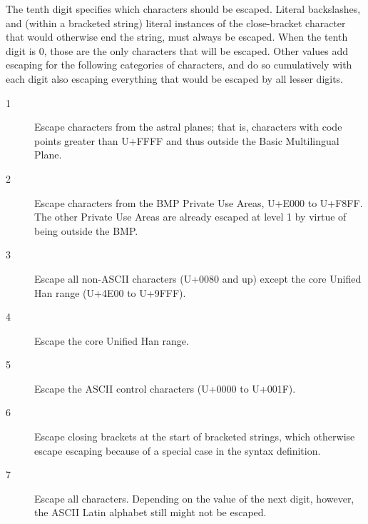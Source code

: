 \documentclass[twocolumn]{report}
\begin{document}
The tenth digit specifies which characters should be escaped.  Literal
backslashes, and (within a bracketed string) literal instances of the
close-bracket character that would otherwise end the string, must
always be escaped. 
When the tenth digit is 0, those are the only characters that will be escaped. 
Other values add escaping for the following categories of characters, and do
so cumulatively with each digit also escaping everything that would be
escaped by all lesser digits.
\begin{description}
  \item[1] Escape characters from the astral planes; that is,
    characters with code points greater than U+FFFF and thus outside the
    Basic Multilingual Plane.
  \item[2] Escape characters from the BMP Private Use Areas, U+E000 to
    U+F8FF.  The other Private Use Areas are already escaped at level 1
    by virtue of being outside the BMP.
  \item[3] Escape all non-ASCII characters (U+0080 and up) except the core
    Unified Han range (U+4E00 to U+9FFF).
  \item[4] Escape the core Unified Han range.
  \item[5] Escape the ASCII control characters (U+0000 to U+001F).
  \item[6] Escape closing brackets at the start of bracketed strings, which
    otherwise escape escaping because of a special case in
    the syntax definition.
  \item[7] Escape all characters.  Depending on the value of the next digit,
    however, the ASCII Latin alphabet still might not be escaped.
\end{description}
\end{document}
